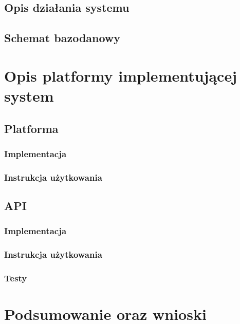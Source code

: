 \documentclass[12pt]{report}
\begin{document}
         \section{Opis działania systemu}
         \section{Schemat bazodanowy}
    \chapter{Opis platformy implementującej system}
        \section{Platforma}
            \subsection{Implementacja}
            \subsection{Instrukcja użytkowania}
        \section{API}
            \subsection{Implementacja}
            \subsection{Instrukcja użytkowania}
            \subsection{Testy}
    \chapter{Podsumowanie oraz wnioski}
    \listoffigures
    
\end{document}
